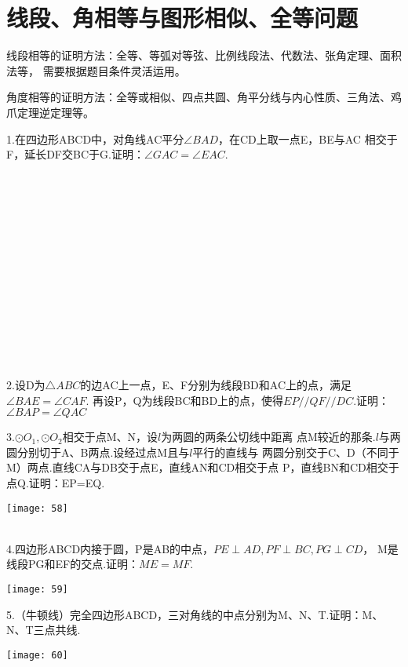 \section{线段、角相等与图形相似、全等问题}
线段相等的证明方法：全等、等弧对等弦、比例线段法、代数法、张角定理、面积法等，
需要根据题目条件灵活运用。

角度相等的证明方法：全等或相似、四点共圆、角平分线与内心性质、三角法、鸡爪定理逆定理等。


1.在四边形ABCD中，对角线AC平分$\angle BAD$，在CD上取一点E，BE与AC
相交于F，延长DF交BC于G.证明：$\angle GAC=\angle EAC$.
~\\
~\\
~\\
~\\
~\\
~\\
~\\
~\\
~\\
~\\
~\\
~\\
~\\
~\\
~\\

2.设D为$\bigtriangleup ABC$的边AC上一点，E、F分别为线段BD和AC上的点，满足$\angle BAE=\angle CAF$.
再设P，Q为线段BC和BD上的点，使得$EP//QF//DC$.证明：$\angle BAP=\angle QAC$

\newpage

3.$\odot O_1,\odot O_2$相交于点M、N，设$l$为两圆的两条公切线中距离
点M较近的那条.$l$与两圆分别切于A、B两点.设经过点M且与$l$平行的直线与
两圆分别交于C、D（不同于M）两点.直线CA与DB交于点E，直线AN和CD相交于点
P，直线BN和CD相交于点Q.证明：EP=EQ.
\begin{flushleft}
    \texttt{[image: 58]}
\end{flushleft}
~\\

4.四边形ABCD内接于圆，P是AB的中点，$PE\perp AD,PF\perp BC,PG\perp CD$，
M是线段PG和EF的交点.证明：$ME=MF$.
\begin{flushleft}
    \texttt{[image: 59]}
\end{flushleft}

5.（牛顿线）完全四边形ABCD，三对角线的中点分别为M、N、T.证明：M、N、T三点共线.
\begin{flushleft}
    \texttt{[image: 60]}
\end{flushleft}

